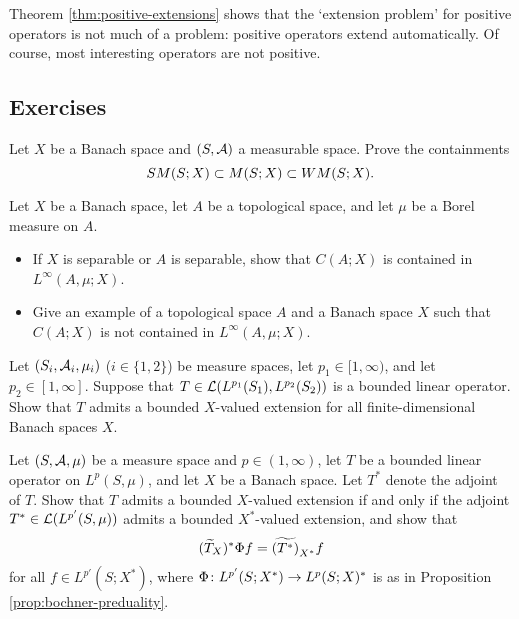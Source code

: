 Theorem \ref{thm:positive-extensions} shows that the `extension problem' for positive operators is not much of a problem: positive operators extend automatically.
Of course, most interesting operators are not positive.

\begin{example}
\end{example}



\subsection*{Exercises}

\begin{exercise}\label{ex:measurability-containments}
  Let $X$ be a Banach space and $(S,\mathcal{A})$ a measurable space.
  Prove the containments
  \begin{equation*}
    SM(S;X) \subset M(S;X) \subset WM(S;X).
  \end{equation*}
\end{exercise}

\begin{exercise}
  Let $X$ be a Banach space, let $A$ be a topological space, and let $\mu$ be a Borel measure on $A$.
  \begin{itemize}
  \item If $X$ is separable or $A$ is separable, show that $C(A;X)$ is contained in $L^\infty(A, \mu;X)$.
  \item Give an example of a topological space $A$ and a Banach space $X$ such that $C(A;X)$ is not contained in $L^\infty(A,\mu;X)$.
  \end{itemize}
\end{exercise}

\begin{exercise}
  Let $(S_i, \mathcal{A}_i, \mu_i)$ ($i \in \{1,2\}$) be measure spaces, let $p_1 \in [1,\infty)$, and let $p_2 \in [1,\infty]$.
  Suppose that $T \in \mathcal{L}(L^{p_1}(S_1), L^{p_2}(S_2))$ is a bounded linear operator. 
  Show that $T$ admits a bounded $X$-valued extension for all finite-dimensional Banach spaces $X$.
\end{exercise}

\begin{exercise}\label{ex:tensor-adjoint}
  Let $(S,\mathcal{A},\mu)$ be a measure space and $p \in (1,\infty)$, let $T$ be a bounded linear operator on $L^p(S,\mu)$, and let $X$ be a Banach space.
  Let $T^*$ denote the adjoint of $T$.
  Show that $T$ admits a bounded $X$-valued extension if and only if the adjoint $T^* \in \mathcal{L}(L^{p'}(S,\mu))$ admits a bounded $X^*$-valued extension, and show that
  \begin{equation*}
    (\widetilde{T}_X)^* \Phi f = \widetilde{(T^*)}_{X^*} f
  \end{equation*}
  for all $f \in L^{p'}(S;X^*)$, where $\Phi \colon L^{p'}(S;X^*) \rightarrow L^p(S;X)^*$ is as in Proposition \ref{prop:bochner-preduality}. 
\end{exercise}

